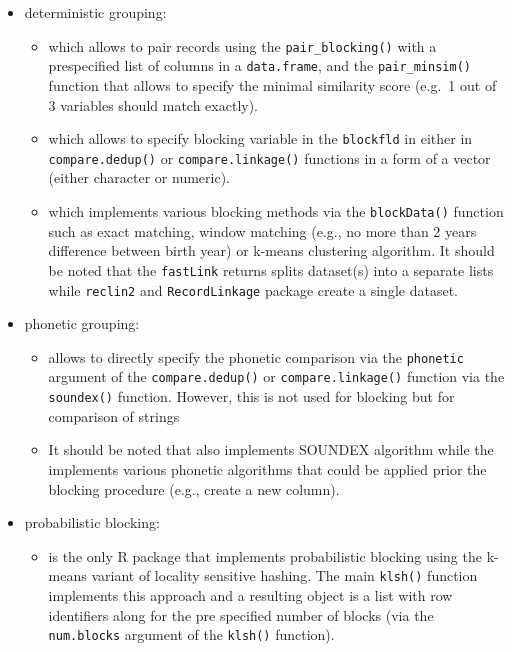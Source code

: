 \begin{itemize}
\tightlist
\item
  deterministic grouping:

  \begin{itemize}
  \tightlist
  \item
     \citep[\citet{reclin2-rjournal}]{reclin2} which allows to pair records using the \texttt{pair\_blocking()} with a prespecified list of columns in a \texttt{data.frame}, and the \texttt{pair\_minsim()} function that allows to specify the minimal similarity score (e.g.~1 out of 3 variables should match exactly).
  \item
     \citep[\citet{RecordLinkage-rjournal}]{RecordLinkage} which allows to specify blocking variable in the \texttt{blockfld} in either in \texttt{compare.dedup()} or \texttt{compare.linkage()} functions in a form of a vector (either character or numeric).
  \item
     \citep[\citet{enamorado2019using}]{fastLink} which implements various blocking methods via the \texttt{blockData()} function such as exact matching, window matching (e.g., no more than 2 years difference between birth year) or k-means clustering algorithm. It should be noted that the \texttt{fastLink} returns splits dataset(s) into a separate lists while \texttt{reclin2} and \texttt{RecordLinkage} package create a single dataset.
  \end{itemize}
\item
  phonetic grouping:

  \begin{itemize}
  \tightlist
  \item
     allows to directly specify the phonetic comparison via the \texttt{phonetic} argument of the \texttt{compare.dedup()} or \texttt{compare.linkage()} function via the \texttt{soundex()} function. However, this is not used for blocking but for comparison of strings
  \item
    It should be noted that  \citep{stringdist} also implements SOUNDEX algorithm while the  \citep[\citet{Phonetic2020}]{phonics} implements various phonetic algorithms that could be applied prior the blocking procedure (e.g., create a new column).
  \end{itemize}
\item
  probabilistic blocking:

  \begin{itemize}
  \tightlist
  \item
     \citep{klsh} is the only R package that implements probabilistic blocking using the k-means variant of locality sensitive hashing. The main \texttt{klsh()} function implements this approach and a resulting object is a list with row identifiers along for the pre specified number of blocks (via the \texttt{num.blocks} argument of the \texttt{klsh()} function).
  \end{itemize}
\end{itemize}

